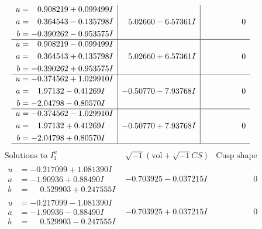 \documentclass[1p]{elsarticle_modified}
\theoremstyle{definition}
\newcommand{\I}{\sqrt{-1}}
\begin{document}
$$\begin{array}{c|c|c}
\begin{aligned}
u &= \phantom{-}0.908219 + 0.099499 I \\
a &= \phantom{-}0.364543 - 0.135798 I \\
b &= -0.390262 - 0.953575 I\end{aligned}
 & \phantom{-}5.02660 - 6.57361 I & \phantom{-0.000000 } 0 \\ \hline\begin{aligned}
u &= \phantom{-}0.908219 - 0.099499 I \\
a &= \phantom{-}0.364543 + 0.135798 I \\
b &= -0.390262 + 0.953575 I\end{aligned}
 & \phantom{-}5.02660 + 6.57361 I & \phantom{-0.000000 } 0 \\ \hline\begin{aligned}
u &= -0.374562 + 1.029910 I \\
a &= \phantom{-}1.97132 - 0.41269 I \\
b &= -2.04798 - 0.80570 I\end{aligned}
 & -0.50770 - 7.93768 I & \phantom{-0.000000 } 0 \\ \hline\begin{aligned}
u &= -0.374562 - 1.029910 I \\
a &= \phantom{-}1.97132 + 0.41269 I \\
b &= -2.04798 + 0.80570 I\end{aligned}
 & -0.50770 + 7.93768 I & \phantom{-0.000000 } 0\\
 \hline 
 \end{array}$$\newpage$$\begin{array}{c|c|c}  
\text{Solutions to }I^u_{1}& \I (\text{vol} + \sqrt{-1}CS) & \text{Cusp shape}\\
 \hline 
\begin{aligned}
u &= -0.217099 + 1.081390 I \\
a &= -1.90936 + 0.88490 I \\
b &= \phantom{-}0.529903 + 0.247555 I\end{aligned}
 & -0.703925 - 0.037215 I & \phantom{-0.000000 } 0 \\ \hline\begin{aligned}
u &= -0.217099 - 1.081390 I \\
a &= -1.90936 - 0.88490 I \\
b &= \phantom{-}0.529903 - 0.247555 I\end{aligned}
 & -0.703925 + 0.037215 I & \phantom{-0.000000 } 0 \\ \hline\begin{aligned}

\end{aligned}
\end{array}$$
\end{document}
